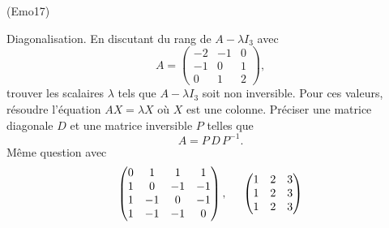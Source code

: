 \begin{tiny}(Emo17)\end{tiny} Diagonalisation. \newline
En discutant du rang de $A-\lambda I_3$ avec 
\begin{displaymath}
  A = 
\begin{pmatrix}
  -2 & -1 & 0 \\ -1 & 0 & 1 \\ 0 & 1 & 2
\end{pmatrix},
\end{displaymath}
trouver les scalaires $\lambda$ tels que $A-\lambda I_3$ soit non inversible. Pour ces valeurs, résoudre l'équation $A X = \lambda X$ où $X$ est une colonne. Préciser une matrice diagonale $D$ et une matrice inversible $P$ telles que
\begin{displaymath}
  A = P\,D\,P^{-1}.
\end{displaymath}
Même question avec
\begin{displaymath}
\begin{pmatrix}
  0 & 1 & 1 & 1 \\ 1 & 0 & -1 & -1\\ 1 & -1 & 0 & -1 \\ 1 & -1 & -1 & 0
\end{pmatrix}, \hspace{0.5cm}
\begin{pmatrix}
 1 & 2 & 3 \\  1 & 2 & 3 \\  1 & 2 & 3 
\end{pmatrix}
\end{displaymath}

